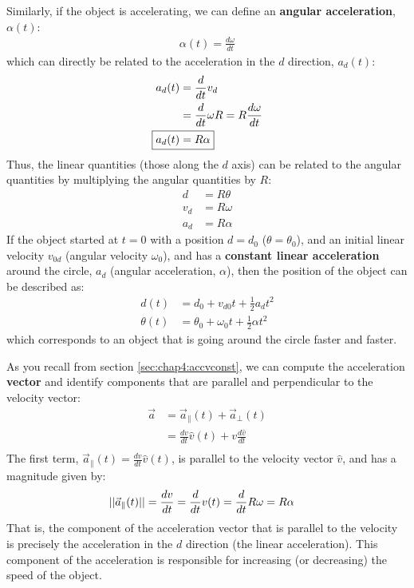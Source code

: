 Similarly, if the object is accelerating, we can define an \textbf{angular acceleration}, $\alpha(t)$:
\begin{align*}
\alpha(t)=\frac{d\omega}{dt}
\end{align*}
which can directly be related to the acceleration in the $d$ direction, $a_d(t)$:
\begin{align*}
a_d(t) &= \frac{d}{dt}v_d\\
&=\frac{d}{dt}\omega R=R\frac{d\omega}{dt}\\
\Aboxed{a_d(t)&=R\alpha }
\end{align*}
Thus, the linear quantities (those along the $d$ axis) can be related to the angular quantities by multiplying the angular quantities by $R$:
\begin{align}
d&=R\theta\\
v_d&=R\omega\\
a_d&=R\alpha
\end{align}
If the object started at $t=0$ with a position $d=d_0$ ($\theta=\theta_0$), and an initial linear velocity $v_{0d}$ (angular velocity $\omega_0$), and has a \textbf{constant linear acceleration} around the circle, $a_d$ (angular acceleration, $\alpha$), then the position of the object can be described as:
\begin{align*}
d(t) &= d_0+v_{d0}t+\frac{1}{2}a_d t^2\\
\theta(t) &= \theta_0+\omega_0t+\frac{1}{2}\alpha t^2
\end{align*}
which corresponds to an object that is going around the circle faster and faster.

As you recall from section \ref{sec:chap4:accvconst}, we can compute the acceleration \textbf{vector} and identify components that are parallel and perpendicular to the velocity vector:
\begin{align*}
\vec a&=\vec a_{\parallel}(t) + \vec a_{\bot}(t)\\
&=\frac{dv}{dt}\hat v(t)+v\frac{d\hat v}{dt}\\
\end{align*}
The first term, $\vec a_{\parallel}(t)=\frac{dv}{dt}\hat v(t)$, is parallel to the velocity vector $\hat v$, and has a magnitude given by:
\begin{align*}
||\vec a_{\parallel}(t)||&=\frac{dv}{dt}=\frac{d}{dt} v(t)=\frac{d}{dt} R\omega=R\alpha
\end{align*}
That is, the component of the acceleration vector that is parallel to the velocity is precisely the acceleration in the $d$ direction (the linear acceleration). This component of the acceleration is responsible for increasing (or decreasing) the speed of the object. 

